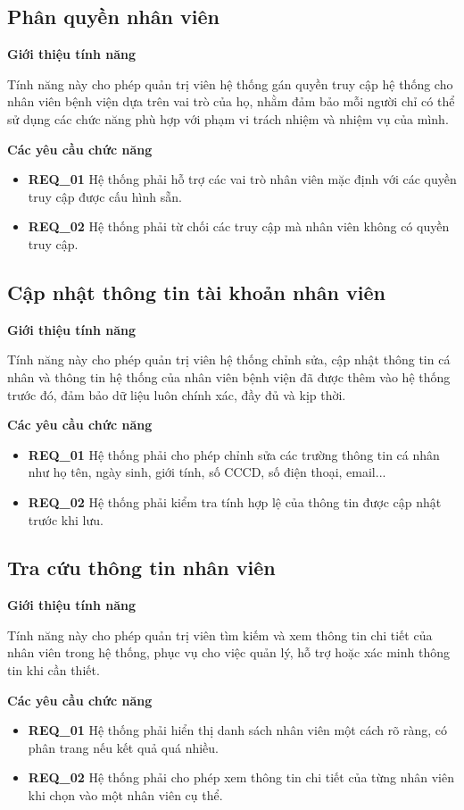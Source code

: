 \subsection{Phân quyền nhân viên}

\noindent \textbf{Giới thiệu tính năng}

Tính năng này cho phép quản trị viên hệ thống gán quyền truy cập hệ thống cho nhân viên bệnh viện dựa trên vai trò của họ, nhằm đảm bảo mỗi người chỉ có thể sử dụng các chức năng phù hợp với phạm vi trách nhiệm và nhiệm vụ của mình.

\noindent \textbf{Các yêu cầu chức năng}

\begin{itemize}
  \item \textbf{REQ\_01} Hệ thống phải hỗ trợ các vai trò nhân viên mặc định với các quyền truy cập được cấu hình sẵn.
  \item \textbf{REQ\_02} Hệ thống phải từ chối các truy cập mà nhân viên không có quyền truy cập.
\end{itemize}

\subsection{Cập nhật thông tin tài khoản nhân viên}

\noindent \textbf{Giới thiệu tính năng}

Tính năng này cho phép quản trị viên hệ thống chỉnh sửa, cập nhật thông tin cá nhân và thông tin hệ thống của nhân viên bệnh viện đã được thêm vào hệ thống trước đó, đảm bảo dữ liệu luôn chính xác, đầy đủ và kịp thời.

\noindent \textbf{Các yêu cầu chức năng}

\begin{itemize}
  \item \textbf{REQ\_01} Hệ thống phải cho phép chỉnh sửa các trường thông tin cá nhân như họ tên, ngày sinh, giới tính, số CCCD, số điện thoại, email...
  \item \textbf{REQ\_02} Hệ thống phải kiểm tra tính hợp lệ của thông tin được cập nhật trước khi lưu.
\end{itemize}

\subsection{Tra cứu thông tin nhân viên}

\noindent \textbf{Giới thiệu tính năng}

Tính năng này cho phép quản trị viên tìm kiếm và xem thông tin chi tiết của nhân viên trong hệ thống, phục vụ cho việc quản lý, hỗ trợ hoặc xác minh thông tin khi cần thiết.

\noindent \textbf{Các yêu cầu chức năng}

\begin{itemize}
  \item \textbf{REQ\_01} Hệ thống phải hiển thị danh sách nhân viên một cách rõ ràng, có phân trang nếu kết quả quá nhiều.
  \item \textbf{REQ\_02} Hệ thống phải cho phép xem thông tin chi tiết của từng nhân viên khi chọn vào một nhân viên cụ thể.
\end{itemize}

